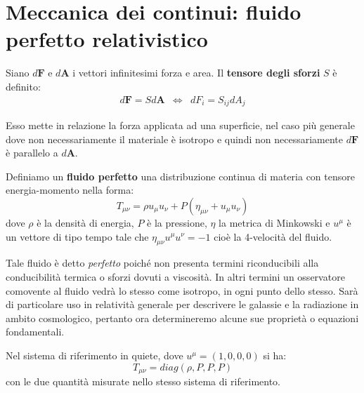 \chapter{Meccanica dei continui: fluido perfetto relativistico}\label{para.fluido}
\begin{definizione}
Siano $d\bm{F}$ e $d\bm{A}$ i vettori infinitesimi forza e area. Il \textbf{tensore degli sforzi} $S$ è definito:
\begin{equation*}
\begin{array}{ccc}
     d\bm{F} = S d\bm{A} & \iff & dF_i = S_{ij}dA_j
\end{array}
\end{equation*}
\end{definizione}
Esso mette in relazione la forza applicata ad una superficie, nel caso più generale dove non necessariamente il materiale è isotropo e quindi non necessariamente $d\bm{F}$ è parallelo a $d\bm{A}$.

\begin{definizione}
Definiamo un \textbf{fluido perfetto} una distribuzione continua di materia con tensore energia-momento nella forma:
\begin{equation}
    T_{\mu\nu} = \rho u_\mu u_\nu + P(\eta_{\mu\nu} + u_\mu u_\nu)
    \label{eq.fluidoperfetto}
\end{equation}
dove $\rho$ è la densità di energia, $P$ è la pressione, $\eta$ la metrica di Minkowski e $u^\mu$ è un vettore di tipo tempo tale che $\eta_{\mu\nu}u^\mu u^\nu = -1$ cioè la 4-velocità del fluido.
\end{definizione}

Tale fluido è detto \textit{perfetto} poiché non presenta termini riconducibili alla conducibilità termica o sforzi dovuti a viscosità. 
In altri termini un osservatore comovente al fluido vedrà lo stesso come isotropo, in ogni punto dello stesso.
Sarà di particolare uso in relatività generale per descrivere le galassie e la radiazione in ambito cosmologico, pertanto ora determineremo alcune sue proprietà o equazioni fondamentali.

Nel sistema di riferimento in quiete, dove $u^\mu = (1,0,0,0)$ si ha:
\begin{equation*}
    T_{\mu\nu} = diag(\rho, P,P,P)
\end{equation*}
con le due quantità misurate nello stesso sistema di riferimento.

